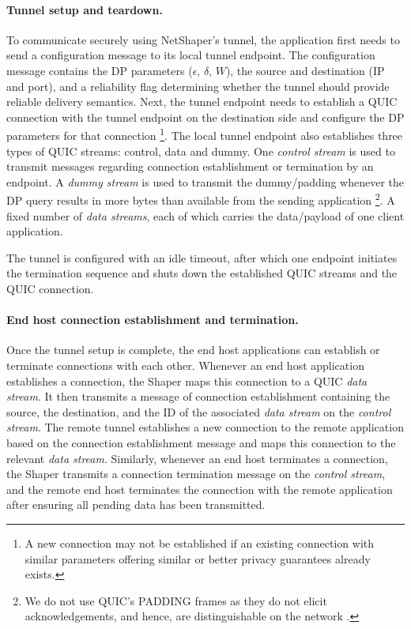 \paragraph{Tunnel setup and teardown.}
To communicate securely using NetShaper's tunnel, the application first needs to send a configuration message to its local tunnel endpoint.
The configuration message contains the DP parameters ($\epsilon$, $\delta$, $W$), the source and destination (IP and port), and a reliability flag determining whether the tunnel should provide reliable delivery semantics.
Next, the tunnel endpoint needs to establish a QUIC connection with the tunnel endpoint on the destination side and configure the DP parameters for that connection
\footnote{A new connection may not be established if an existing connection with similar parameters offering similar or better privacy guarantees already exists.}.
The local tunnel endpoint also establishes three types of QUIC streams: control, data and dummy.
One \textit{control stream} is used to transmit messages regarding connection establishment or termination by an endpoint.
A \textit{dummy stream} is used to transmit the dummy/padding whenever the DP query results in more bytes than available from the sending application
\footnote{We do not use QUIC's PADDING frames as they do not elicit acknowledgements, and hence, are distinguishable on the network \cite{quic_rfc}.}.
A fixed number of \textit{data streams}, each of which carries the data/payload of one client application.

The tunnel is configured with an idle timeout, after which one endpoint initiates the termination sequence and shuts down the established QUIC streams and the QUIC connection.

\paragraph{End host connection establishment and termination.}
Once the tunnel setup is complete, the end host applications can establish or terminate connections with each other.
Whenever an end host application establishes a connection, the Shaper maps this connection to a QUIC \textit{data stream}.
It then transmits a message of connection establishment containing the source, the destination, and the ID of the associated \textit{data stream} on the \textit{control stream}.
The remote tunnel establishes a new connection to the remote application based on the connection establishment message and maps this connection to the relevant \textit{data stream}.
Similarly, whenever an end host terminates a connection, the Shaper transmits a connection termination message on the \textit{control stream}, and the remote end host terminates the connection with the remote application after ensuring all pending data has been transmitted.

